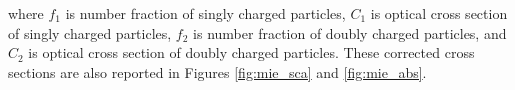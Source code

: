 \documentclass[12pt]{article}
\begin{document}
\noindent where $f_1$ is number fraction of singly charged particles, $C_1$ is optical cross section of singly charged particles, $f_2$ is number fraction of doubly charged particles, and $C_2$ is optical cross section of doubly charged particles. These corrected cross sections are also reported in Figures \ref{fig:mie_sca} and \ref{fig:mie_abs}.




%
%


\end{document}
